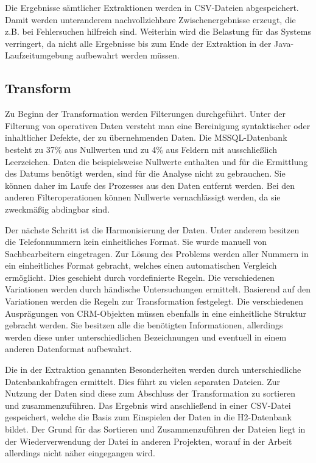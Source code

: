 Die Ergebnisse sämtlicher Extraktionen werden in CSV-Dateien abgespeichert. Damit werden unteranderem nachvollziehbare Zwischenergebnisse erzeugt, die z.B. bei Fehlersuchen hilfreich sind. Weiterhin wird die Belastung für das  Systems verringert, da nicht alle Ergebnisse bis zum Ende der Extraktion in der Java-Laufzeitumgebung aufbewahrt werden müssen.

\subsection{Transform}

Zu Beginn der Transformation werden Filterungen durchgeführt. Unter der Filterung von operativen Daten versteht man eine Bereinigung syntaktischer oder inhaltlicher Defekte, der zu übernehmenden Daten. Die MSSQL-Datenbank besteht zu 37\% aus Nullwerten und zu 4\% aus Feldern mit ausschließlich Leerzeichen. Daten die beispielsweise Nullwerte enthalten und für die Ermittlung des Datums benötigt werden, sind für die Analyse nicht zu gebrauchen. Sie können daher im Laufe des Prozesses aus den Daten entfernt werden. Bei den anderen Filteroperationen können Nullwerte vernachlässigt werden, da sie zweckmäßig abdingbar sind.

Der nächste Schritt ist die Harmonisierung der Daten. Unter anderem besitzen die Telefonnummern kein einheitliches Format. Sie wurde manuell von Sachbearbeitern eingetragen. Zur Lösung des Problems werden aller Nummern in ein einheitliches Format gebracht, welches einen automatischen Vergleich ermöglicht. Dies geschieht durch vordefinierte Regeln. Die verschiedenen Variationen werden durch händische Untersuchungen ermittelt. Basierend auf den Variationen werden die Regeln zur Transformation festgelegt. Die verschiedenen Ausprägungen von CRM-Objekten müssen ebenfalls in eine einheitliche Struktur gebracht werden. Sie besitzen alle die benötigten Informationen, allerdings werden diese unter unterschiedlichen Bezeichnungen und eventuell in einem anderen Datenformat aufbewahrt.

Die in der Extraktion genannten Besonderheiten werden durch unterschiedliche Datenbankabfragen ermittelt. Dies führt zu vielen separaten Dateien. Zur Nutzung der Daten sind diese zum Abschluss der Transformation zu sortieren und zusammenzuführen. Das Ergebnis wird anschließend in einer CSV-Datei gespeichert, welche die Basis zum Einspielen der Daten in die H2-Datenbank bildet. Der Grund für das Sortieren und Zusammenzuführen der Dateien liegt in der Wiederverwendung der Datei in anderen Projekten, worauf in der Arbeit allerdings nicht näher eingegangen wird.

